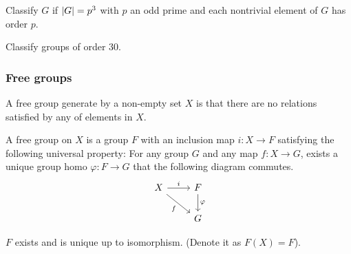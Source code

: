 \begin{exercise}
  Classify $G$ if $\lvert G\rvert = p^3$ with $p$ an odd prime and each nontrivial element of $G$ has order $p$.
\end{exercise}

\begin{exercise}
  Classify groups of order $30$.
\end{exercise}

\subsubsection{Free groups}
A free group generate by a non-empty set $X$ is that
there are no relations satisfied by any of elements in $X$.

\begin{definition}
  A free group on $X$ is a group $F$ with an inclusion map $i: X \to F$ satisfying the
  following universal property: For any group $G$ and any map $f: X \to G$,
  exists a unique group homo $\varphi : F \to G$ that the following diagram commutes.
  \[
    \begin{tikzcd}
    X \arrow{r}{i} \arrow[swap]{dr}{f} & F \arrow{d}{\varphi} \\
    & G
    \end{tikzcd}
  \]
\end{definition}

\begin{theorem}
  $F$ exists and is unique up to isomorphism. (Denote it as $F(X) = F$).
\end{theorem}


